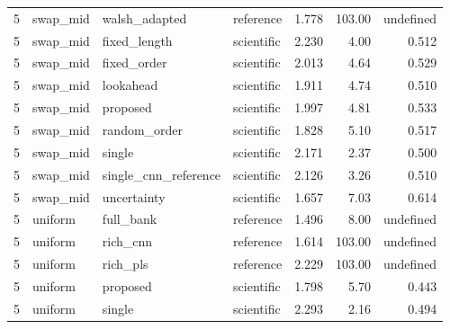 \documentclass[10pt,a4paper]{article}
\begin{document}
\begin{landscape}
\begin{longtable}{llllrrr}
5 & swap\_mid & walsh\_adapted & reference & 1.778 & 103.00 & undefined \\
5 & swap\_mid & fixed\_length & scientific & 2.230 & 4.00 & 0.512 \\
5 & swap\_mid & fixed\_order & scientific & 2.013 & 4.64 & 0.529 \\
5 & swap\_mid & lookahead & scientific & 1.911 & 4.74 & 0.510 \\
5 & swap\_mid & proposed & scientific & 1.997 & 4.81 & 0.533 \\
5 & swap\_mid & random\_order & scientific & 1.828 & 5.10 & 0.517 \\
5 & swap\_mid & single & scientific & 2.171 & 2.37 & 0.500 \\
5 & swap\_mid & single\_cnn\_reference & scientific & 2.126 & 3.26 & 0.510 \\
5 & swap\_mid & uncertainty & scientific & 1.657 & 7.03 & 0.614 \\
5 & uniform & full\_bank & reference & 1.496 & 8.00 & undefined \\
5 & uniform & rich\_cnn & reference & 1.614 & 103.00 & undefined \\
5 & uniform & rich\_pls & reference & 2.229 & 103.00 & undefined \\
5 & uniform & proposed & scientific & 1.798 & 5.70 & 0.443 \\
5 & uniform & single & scientific & 2.293 & 2.16 & 0.494 \\
\bottomrule
\end{longtable}
\normalsize\end{landscape}
\end{document}
